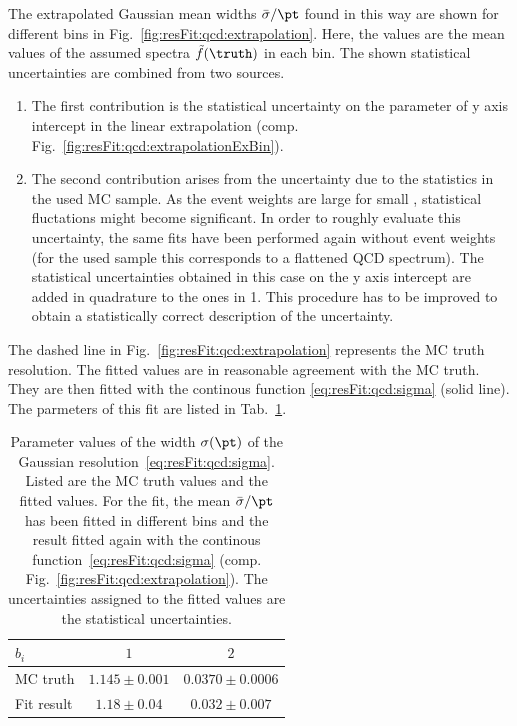 \documentclass[a4paper]{cmspaper} %
\begin{document}
The extrapolated Gaussian mean widths $\bar{\sigma}/\pt$ found in this way are shown for different \pt bins in Fig.~\ref{fig:resFit:qcd:extrapolation}.
Here, the \pt values are the mean values of the assumed spectra $\tilde{f}(\truth)$ in each bin.
The shown statistical uncertainties are combined from two sources.
\begin{enumerate}
\item The first contribution is the statistical uncertainty on the parameter of y axis intercept in the linear extrapolation (comp. Fig.~\ref{fig:resFit:qcd:extrapolationExBin}).
\item The second contribution arises from the uncertainty due to the statistics in the used MC sample.
  As the event weights are large for small \pt, statistical fluctations might become significant.
  In order to roughly evaluate this uncertainty, the same fits have been performed again without event weights (for the used sample this corresponds to a flattened QCD spectrum).
  The statistical uncertainties obtained in this case on the y axis intercept are added in quadrature to the ones in 1.
  This procedure has to be improved to obtain a statistically correct description of the uncertainty.
\end{enumerate}

The dashed line in Fig.~\ref{fig:resFit:qcd:extrapolation} represents the MC truth resolution.
The fitted values are in reasonable agreement with the MC truth.
They are then fitted with the continous function \eqref{eq:resFit:qcd:sigma} (solid line).
The parmeters of this fit are listed in Tab.~\ref{tab:resFit:qcd:resolution}.

\begin{table}[ht]
  \centering
  \begin{tabular}[ht]{lcc}
    \hline \hline
    $b_{i}$ & $1$ & $2$ \\
    \hline
    MC truth    & $1.145 \pm 0.001$ & $0.0370 \pm 0.0006$ \\
    Fit result  & $1.18  \pm 0.04$  & $0.032  \pm 0.007$ \\
    \hline \hline
  \end{tabular}
  \caption{Parameter values of the width $\sigma(\pt)$ of the Gaussian resolution~\eqref{eq:resFit:qcd:sigma}.
    Listed are the MC truth values and the fitted values.
    For the fit, the mean $\bar{\sigma}/\pt$ has been fitted in different \pt bins and the result fitted again with the continous function~\eqref{eq:resFit:qcd:sigma} (comp. Fig.~\ref{fig:resFit:qcd:extrapolation}).
    The uncertainties assigned to the fitted values are the statistical uncertainties.}
  \label{tab:resFit:qcd:resolution}
\end{table}
\end{document}
